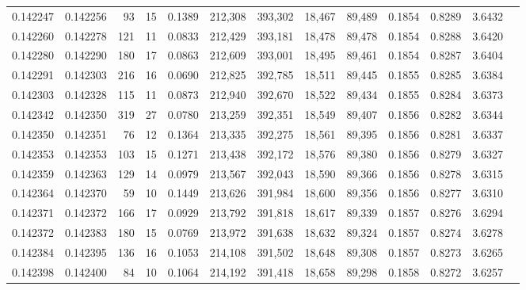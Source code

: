 \begin{tabular}{rrrrrrrrrrrrr}
0.142247 & 0.142256 &    93 &  15 &                                     0.1389 & 212,308 & 393,302 &  18,467 &  89,489 & 0.1854 & 0.8289 & 3.6432 \\
0.142260 & 0.142278 &   121 &  11 &                                     0.0833 & 212,429 & 393,181 &  18,478 &  89,478 & 0.1854 & 0.8288 & 3.6420 \\
0.142280 & 0.142290 &   180 &  17 &                                     0.0863 & 212,609 & 393,001 &  18,495 &  89,461 & 0.1854 & 0.8287 & 3.6404 \\
0.142291 & 0.142303 &   216 &  16 &                                     0.0690 & 212,825 & 392,785 &  18,511 &  89,445 & 0.1855 & 0.8285 & 3.6384 \\
0.142303 & 0.142328 &   115 &  11 &                                     0.0873 & 212,940 & 392,670 &  18,522 &  89,434 & 0.1855 & 0.8284 & 3.6373 \\
0.142342 & 0.142350 &   319 &  27 &                                     0.0780 & 213,259 & 392,351 &  18,549 &  89,407 & 0.1856 & 0.8282 & 3.6344 \\
0.142350 & 0.142351 &    76 &  12 &                                     0.1364 & 213,335 & 392,275 &  18,561 &  89,395 & 0.1856 & 0.8281 & 3.6337 \\
0.142353 & 0.142353 &   103 &  15 &                                     0.1271 & 213,438 & 392,172 &  18,576 &  89,380 & 0.1856 & 0.8279 & 3.6327 \\
0.142359 & 0.142363 &   129 &  14 &                                     0.0979 & 213,567 & 392,043 &  18,590 &  89,366 & 0.1856 & 0.8278 & 3.6315 \\
0.142364 & 0.142370 &    59 &  10 &                                     0.1449 & 213,626 & 391,984 &  18,600 &  89,356 & 0.1856 & 0.8277 & 3.6310 \\
0.142371 & 0.142372 &   166 &  17 &                                     0.0929 & 213,792 & 391,818 &  18,617 &  89,339 & 0.1857 & 0.8276 & 3.6294 \\
0.142372 & 0.142383 &   180 &  15 &                                     0.0769 & 213,972 & 391,638 &  18,632 &  89,324 & 0.1857 & 0.8274 & 3.6278 \\
0.142384 & 0.142395 &   136 &  16 &                                     0.1053 & 214,108 & 391,502 &  18,648 &  89,308 & 0.1857 & 0.8273 & 3.6265 \\
0.142398 & 0.142400 &    84 &  10 &                                     0.1064 & 214,192 & 391,418 &  18,658 &  89,298 & 0.1858 & 0.8272 & 3.6257 \\

\end{tabular}
